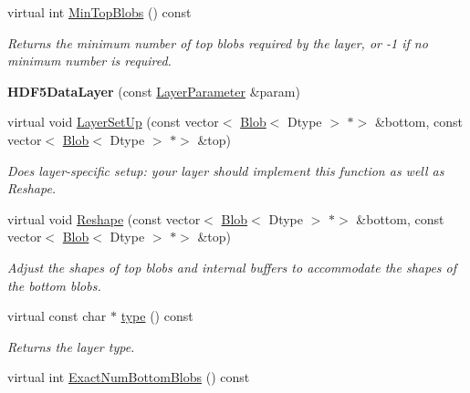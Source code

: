 \begin{DoxyCompactItemize}
virtual int \mbox{\hyperlink{classcaffe_1_1_h_d_f5_data_layer_a6833e081c29049b1392eb98fb4451697}{Min\+Top\+Blobs}} () const
\begin{DoxyCompactList}\small\item\em Returns the minimum number of top blobs required by the layer, or -\/1 if no minimum number is required. \end{DoxyCompactList}\item 
\mbox{\label{classcaffe_1_1_h_d_f5_data_layer_abfc7dcc4f07c228eb0deb1e0dfae1a5f}} 
{\bfseries H\+D\+F5\+Data\+Layer} (const \mbox{\hyperlink{classcaffe_1_1_layer_parameter}{Layer\+Parameter}} \&param)
\item 
virtual void \mbox{\hyperlink{classcaffe_1_1_h_d_f5_data_layer_a7e7281a510b9d6713c3c79c6e50a199b}{Layer\+Set\+Up}} (const vector$<$ \mbox{\hyperlink{classcaffe_1_1_blob}{Blob}}$<$ Dtype $>$ $\ast$$>$ \&bottom, const vector$<$ \mbox{\hyperlink{classcaffe_1_1_blob}{Blob}}$<$ Dtype $>$ $\ast$$>$ \&top)
\begin{DoxyCompactList}\small\item\em Does layer-\/specific setup\+: your layer should implement this function as well as Reshape. \end{DoxyCompactList}\item 
virtual void \mbox{\hyperlink{classcaffe_1_1_h_d_f5_data_layer_a38b8924648ba4ab2933fe389fa608cad}{Reshape}} (const vector$<$ \mbox{\hyperlink{classcaffe_1_1_blob}{Blob}}$<$ Dtype $>$ $\ast$$>$ \&bottom, const vector$<$ \mbox{\hyperlink{classcaffe_1_1_blob}{Blob}}$<$ Dtype $>$ $\ast$$>$ \&top)
\begin{DoxyCompactList}\small\item\em Adjust the shapes of top blobs and internal buffers to accommodate the shapes of the bottom blobs. \end{DoxyCompactList}\item 
\mbox{\label{classcaffe_1_1_h_d_f5_data_layer_a717c78e3de84c43061f5a6d7421104d1}} 
virtual const char $\ast$ \mbox{\hyperlink{classcaffe_1_1_h_d_f5_data_layer_a717c78e3de84c43061f5a6d7421104d1}{type}} () const
\begin{DoxyCompactList}\small\item\em Returns the layer type. \end{DoxyCompactList}\item 
virtual int \mbox{\hyperlink{classcaffe_1_1_h_d_f5_data_layer_a4eb72974cea32c84acb6b8012a0d326b}{Exact\+Num\+Bottom\+Blobs}} () const

\end{DoxyCompactItemize}
